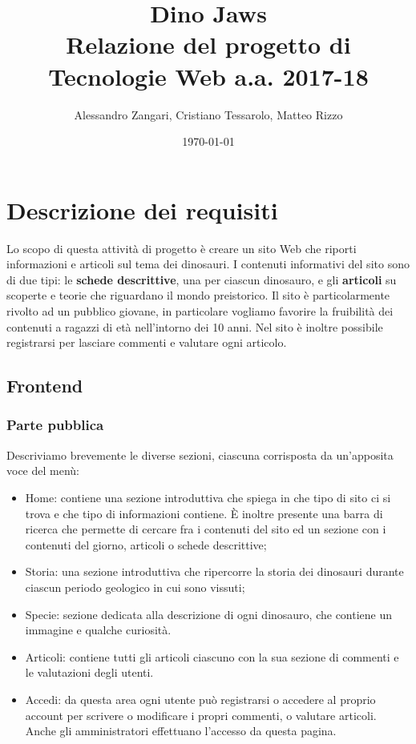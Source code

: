 \documentclass[12pt]{article}
\title{\textbf{Dino Jaws}\\\large Relazione del progetto di Tecnologie Web a.a. 2017-18}
\author{Alessandro Zangari, Cristiano Tessarolo, Matteo Rizzo}
\date{\today}
\begin{document}
	\maketitle
	\tableofcontents
	\clearpage
	
	\section{Descrizione dei requisiti}
	Lo scopo di questa attività di progetto è creare un sito Web che riporti informazioni e articoli sul tema dei dinosauri. I contenuti informativi del sito sono di due tipi: le \textbf{schede descrittive}, una per ciascun dinosauro, e gli \textbf{articoli} su scoperte e teorie che riguardano il mondo preistorico. Il sito è particolarmente rivolto ad un pubblico giovane, in particolare vogliamo favorire la fruibilità dei contenuti a ragazzi di età nell'intorno dei 10 anni. Nel sito è inoltre possibile registrarsi per lasciare commenti e valutare ogni articolo.
	\subsection{Frontend}
	
	\subsubsection{Parte pubblica}
	Descriviamo brevemente le diverse sezioni, ciascuna corrisposta da un'apposita voce del menù:
	\begin{itemize}
		\item Home: contiene una sezione introduttiva che spiega in che tipo di sito ci si trova e che tipo di informazioni contiene. È inoltre presente una barra di ricerca che permette di cercare fra i contenuti del sito ed un sezione con i contenuti del giorno, articoli o schede descrittive;
		\item Storia: una sezione introduttiva che ripercorre la storia dei dinosauri durante ciascun periodo geologico in cui sono vissuti;
		\item Specie: sezione dedicata alla descrizione di ogni dinosauro, che contiene un immagine e qualche curiosità.
		\item Articoli: contiene tutti gli articoli ciascuno con la sua sezione di commenti e le valutazioni degli utenti.
		\item Accedi: da questa area ogni utente può registrarsi o accedere al proprio account per scrivere o modificare i propri commenti, o valutare articoli.
		Anche gli amministratori effettuano l'accesso da questa pagina.
	\end{itemize}
\end{document}
